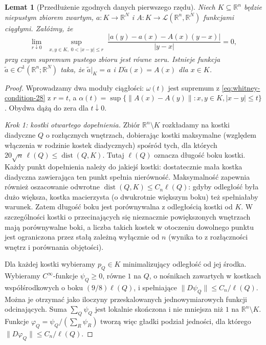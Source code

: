 \documentclass[11pt,a4paper,oneside]{book}
\numberwithin{equation}{chapter}
\theoremstyle{plain}
\newtheorem{lemat}[twierdzenie]{Lemat}
\theoremstyle{definition}
\theoremstyle{remark}
\begin{document}
\begin{lemat}[Przedłużenie zgodnych danych pierwszego rzędu]
\label{lem:whitney-c1-28}
Niech $K\subseteq\mathbb R^n$ będzie niepustym zbiorem zwartym,
$a:K\to\mathbb R^N$ i
$A:K\to\mathcal L(\mathbb R^n,\mathbb R^N)$ funkcjami ciągłymi.
Załóżmy, że
\begin{equation}\label{eq:whitney-condition-28}
 \lim_{r\downarrow0}\ \sup_{\substack{x,y\in K,\;0<|x-y|\le r}}
 \frac{|a(y)-a(x)-A(x)(y-x)|}{|y-x|}=0,
\end{equation}
przy czym supremum pustego zbioru jest równe zeru.
Istnieje funkcja $\widetilde a\in C^1(\mathbb R^n;\mathbb R^N)$
taka, że $\widetilde a|_K=a$ i
$D\widetilde a(x)=A(x)$ dla $x\in K$.
\end{lemat}
\begin{proof}
Wprowadzamy dwa moduły ciągłości: $\omega(t)$ jest
supremum z \eqref{eq:whitney-condition-28} z $r=t$,
a $\alpha(t)=\sup\{\|A(x)-A(y)\|:x,y\in K,
|x-y|\le t\}$. Obydwa dążą do zera dla $t\downarrow0$.

\emph{Krok 1: kostki otwartego dopełnienia.}
Zbiór $\mathbb R^n\setminus K$ rozkładamy na kostki
diadyczne $Q$ o rozłącznych wnętrzach, dobierając
kostki maksymalne (względem włączenia w rodzinie
kostek diadycznych) spośród tych, dla których
$20\sqrt n\,\ell(Q)\le\operatorname{dist}(Q,K)$.
Tutaj $\ell(Q)$ oznacza długość boku kostki.
Każdy punkt dopełnienia należy do jakiejś kostki:
dostatecznie mała kostka diadyczna zawierająca ten
punkt spełnia nierówność. Maksymalność zapewnia
również oszacowanie odwrotne
$\operatorname{dist}(Q,K)\le C_n\ell(Q)$:
gdyby odległość była dużo większa, kostka macierzysta
(o dwukrotnie większym boku) też spełniałaby warunek.
Zatem długość boku jest porównywalna z odległością
kostki od $K$. W szczególności kostki o przecinających
się nieznacznie powiększonych wnętrzach mają
porównywalne boki, a liczba takich kostek w otoczeniu
dowolnego punktu jest ograniczona przez stałą zależną
wyłącznie od $n$ (wynika to z rozłączności wnętrz
i porównania objętości).

Dla każdej kostki wybieramy $p_Q\in K$ minimalizujący
odległość od jej środka. Wybieramy $C^\infty$-funkcje
$\psi_Q\ge0$, równe $1$ na $Q$, o nośnikach zawartych
w kostkach współśrodkowych o boku $(9/8)\ell(Q)$,
i spełniające $\|D\psi_Q\|\le C_n/\ell(Q)$.
Można je otrzymać jako iloczyny przeskalowanych
jednowymiarowych funkcji odcinających.
Suma $\sum_Q\psi_Q$ jest lokalnie skończona i nie
mniejsza niż $1$ na $\mathbb R^n\setminus K$.
Funkcje $\varphi_Q=\psi_Q/(\sum_R\psi_R)$ tworzą
więc gładki podział jedności, dla którego
$\|D\varphi_Q\|\le C_n/\ell(Q)$.


\end{proof}
\end{document}
